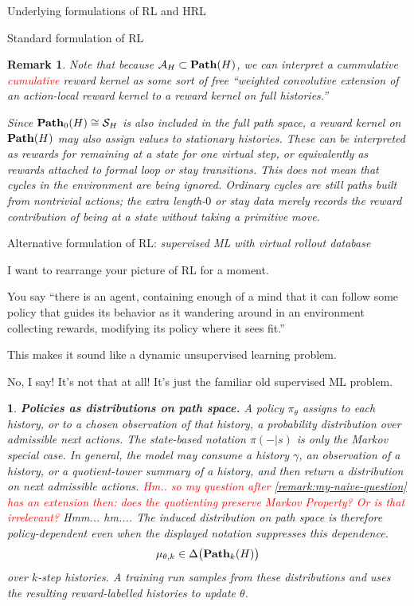 \documentclass[11pt]{article}
\newtheorem{remark}[subsubsection]{Remark}
\newtheorem{ermark}[subsubsection]{}
\begin{document}
\begin{section}{Underlying formulations of RL and HRL}
\begin{subsection}{Standard formulation of RL}
\begin{remark}
\normalfont
Note that because $\mathcal{A}_{H}\subset\bold{Path}(H)$, we can interpret a cummulative \textcolor{red}{cumulative} reward kernel as some sort of free ``weighted convolutive extension of an action-local reward kernel to a reward kernel on full histories.''

Since $\bold{Path}_{0}(H)\cong\mathcal{S}_{H}$ is also included in the full path space, a reward kernel on $\bold{Path}(H)$ may also assign values to stationary histories. These can be interpreted as rewards for remaining at a state for one virtual step, or equivalently as rewards attached to formal loop or stay transitions. This does not mean that cycles in the environment are being ignored. Ordinary cycles are still paths built from nontrivial actions; the extra length-$0$ or stay data merely records the reward contribution of being at a state without taking a primitive move.
\end{remark}
 
\end{subsection}

\begin{subsection}{Alternative formulation of RL: {\em supervised ML with virtual rollout database}}

I want to rearrange your picture of RL for a moment.

You say ``there is an agent, containing enough of a mind that it can follow some policy that guides its behavior as it wandering around in an environment collecting rewards, modifying its policy where it sees fit.'' 

This makes it sound like a dynamic unsupervised learning problem. 

No, I say! It's not that at all! It's just the familiar old supervised ML problem.

\begin{ermark}
{\bf Policies as distributions on path space.}
\normalfont
A policy $\pi_\theta$ assigns to each history, or to a chosen observation of that history, a probability distribution over admissible next actions. The state-based notation $\pi(-|s)$ is only the Markov special case. In general, the model may consume a history $\gamma$, an observation of a history, or a quotient-tower summary of a history, and then return a distribution on next admissible actions. \textcolor{red}{Hm.. so my question after \ref{remark:my-naive-question} has an extension then: does the quotienting preserve Markov Property? Or is that irrelevant?} {\color{blue} Hmm... hm.... } The induced distribution on path space is therefore policy-dependent even when the displayed notation suppresses this dependence.
\[
    \mu_{\theta,k}\in \Delta\big(\bold{Path}_k(H)\big)
\]
over $k$-step histories.  A training run samples from these distributions and uses the resulting reward-labelled histories to update $\theta$.
\end{ermark}


\end{subsection}
\end{section}
\end{document}
